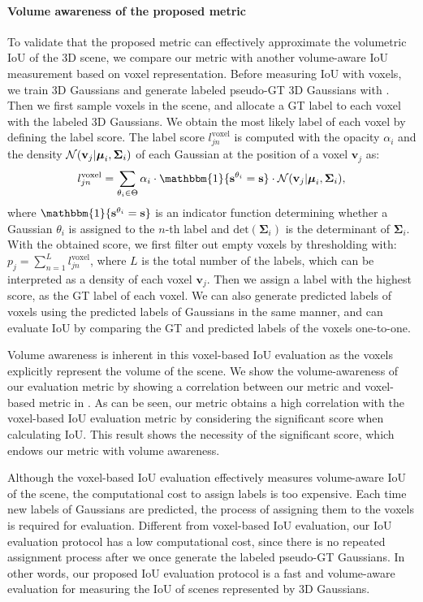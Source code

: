 \paragraph{Volume awareness of the proposed metric}
To validate that the proposed metric can effectively approximate the volumetric IoU of the 3D scene, we compare our metric with another volume-aware IoU measurement based on voxel representation. Before measuring IoU with voxels, we train 3D Gaussians and generate labeled pseudo-GT 3D Gaussians with . Then we first sample voxels in the scene, and allocate a GT label to each voxel with the labeled 3D Gaussians. We obtain the most likely label of each voxel by defining the label score. The label score $l_{jn}^\text{voxel}$ is computed with the opacity $\alpha_i$ and the density $\mathcal{N}(\mathbf{v}_j | \mbox{\boldmath $\mu$}_i, \mathbf{\Sigma}_i)$ of each Gaussian at the position of a voxel $\mathbf{v}_j$ as:
\begin{equation}
    l_{jn}^\text{voxel} = \sum_{\theta_i \in \Theta}\alpha_i \cdot \mathbbm{1}\{\mathbf{s}^{\theta_i} = \mathbf{s}\} \cdot \mathcal{N}(\mathbf{v}_j | \bmu_i, \mathbf{\Sigma}_i),
    \label{eq:pseudo_labeling_voxels}
\end{equation}
where $\mathbbm{1}\{\mathbf{s}^{\theta_i} = \mathbf{s}\}$ is an indicator function determining whether a Gaussian $\theta_i$ is assigned to the $n$-th label and $\text{det}(\mathbf{\Sigma}_i)$ is the determinant of $\mathbf{\Sigma}_i$. With the obtained score, we first filter out empty voxels by thresholding with: $p_j = \sum_{n=1}^{L}l^\text{voxel}_{jn}$, where $L$ is the total number of the labels, which can be interpreted as a density of each voxel $\mathbf{v}_j$. Then we assign a label with the highest score, as the GT label of each voxel. We can also generate predicted labels of voxels using the predicted labels of Gaussians in the same manner, and can evaluate IoU by comparing the GT and predicted labels of the voxels one-to-one.

Volume awareness is inherent in this voxel-based IoU evaluation as the voxels explicitly represent the volume of the scene. We show the volume-awareness of our evaluation metric by showing a correlation between our metric and voxel-based metric in . As can be seen, our metric obtains a high correlation with the voxel-based IoU evaluation metric by considering the significant score when calculating IoU. This result shows the necessity of the significant score, which endows our metric with volume awareness.

Although the voxel-based IoU evaluation effectively measures volume-aware IoU of the scene, the computational cost to assign labels is too expensive. Each time new labels of Gaussians are predicted, the process of assigning them to the voxels is required for evaluation. Different from voxel-based IoU evaluation, our IoU evaluation protocol has a low computational cost, since there is no repeated assignment process after we once generate the labeled pseudo-GT Gaussians. In other words, our proposed IoU evaluation protocol is a fast and volume-aware evaluation for measuring the IoU of scenes represented by 3D Gaussians.  